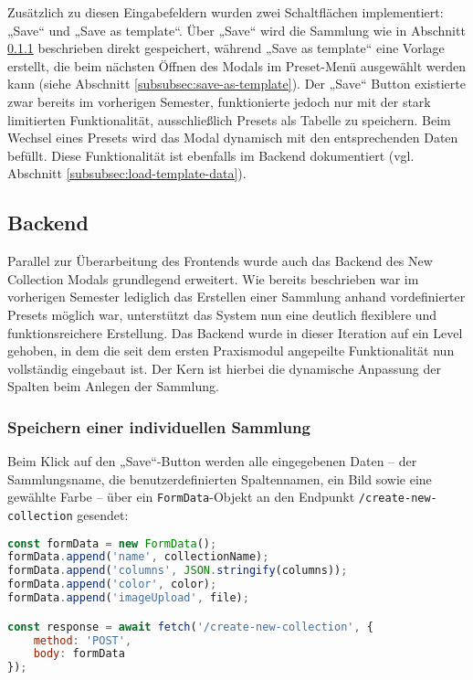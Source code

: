 Zusätzlich zu diesen Eingabefeldern wurden zwei Schaltflächen implementiert: „Save“ und „Save as template“.
Über „Save“ wird die Sammlung wie in Abschnitt \ref{subsubsec:save-new-collection} beschrieben direkt gespeichert, während „Save as template“ eine Vorlage erstellt, die beim nächsten Öffnen des Modals im Preset-Menü ausgewählt werden kann (siehe Abschnitt \ref{subsubsec:save-as-template}).
Der „Save“ Button existierte zwar bereits im vorherigen Semester, funktionierte jedoch nur mit der stark limitierten Funktionalität, ausschließlich Presets als Tabelle zu speichern.
Beim Wechsel eines Presets wird das Modal dynamisch mit den entsprechenden Daten befüllt.
Diese Funktionalität ist ebenfalls im Backend dokumentiert (vgl. Abschnitt \ref{subsubsec:load-template-data}).

\subsection{Backend}\label{subsec:new-collection-backend}

Parallel zur Überarbeitung des Frontends wurde auch das Backend des New Collection Modals grundlegend erweitert.
Wie bereits beschrieben war im vorherigen Semester lediglich das Erstellen einer Sammlung anhand vordefinierter Presets möglich war, unterstützt das System nun eine deutlich flexiblere und funktionsreichere Erstellung.
Das Backend wurde in dieser Iteration auf ein Level gehoben, in dem die seit dem ersten Praxismodul angepeilte Funktionalität nun vollständig eingebaut ist.
Der Kern ist hierbei die dynamische Anpassung der Spalten beim Anlegen der Sammlung.

\subsubsection{Speichern einer individuellen Sammlung}\label{subsubsec:save-new-collection}

Beim Klick auf den „Save“-Button werden alle eingegebenen Daten – der Sammlungsname, die benutzerdefinierten Spaltennamen, ein Bild sowie eine gewählte Farbe – über ein \texttt{FormData}-Objekt an den Endpunkt \texttt{/create-new-collection} gesendet:

\begin{lstlisting}[language=JavaScript, caption=Clientseitiges Speichern einer neuen Sammlung]
const formData = new FormData();
formData.append('name', collectionName);
formData.append('columns', JSON.stringify(columns));
formData.append('color', color);
formData.append('imageUpload', file);

const response = await fetch('/create-new-collection', {
    method: 'POST',
    body: formData
});
\end{lstlisting}

